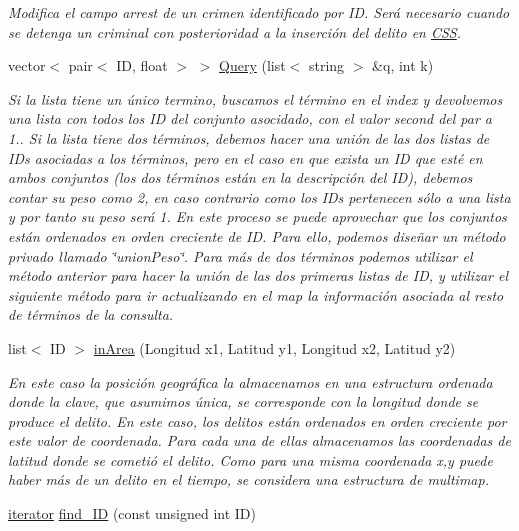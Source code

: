 \begin{DoxyCompactItemize}
\begin{DoxyCompactList}\small\item\em Modifica el campo arrest de un crimen identificado por I\+D. Será necesario cuando se detenga un criminal con posterioridad a la inserción del delito en \hyperlink{classCSS}{C\+S\+S}. \end{DoxyCompactList}\item 
\hypertarget{classCSS_a000e80598d854ef16f4c49365b707b2c}{}vector$<$ pair$<$ I\+D, float $>$ $>$ \hyperlink{classCSS_a000e80598d854ef16f4c49365b707b2c}{Query} (list$<$ string $>$ \&q, int k)\label{classCSS_a000e80598d854ef16f4c49365b707b2c}

\begin{DoxyCompactList}\small\item\em Si la lista tiene un único termino, buscamos el término en el index y devolvemos una lista con todos los I\+D del conjunto asocidado, con el valor second del par a 1.. Si la lista tiene dos términos, debemos hacer una unión de las dos listas de I\+Ds asociadas a los términos, pero en el caso en que exista un I\+D que esté en ambos conjuntos (los dos términos están en la descripción del I\+D), debemos contar su peso como 2, en caso contrario como los I\+Ds pertenecen sólo a una lista y por tanto su peso será 1. En este proceso se puede aprovechar que los conjuntos están ordenados en orden creciente de I\+D. Para ello, podemos diseñar un método privado llamado \char`\"{}union\+Peso\char`\"{}. Para más de dos términos podemos utilizar el método anterior para hacer la unión de las dos primeras listas de I\+D, y utilizar el siguiente método para ir actualizando en el map la información asociada al resto de términos de la consulta. \end{DoxyCompactList}\item 
\hypertarget{classCSS_ab4cda3a2b096b51e39a96a380eec92a7}{}list$<$ I\+D $>$ \hyperlink{classCSS_ab4cda3a2b096b51e39a96a380eec92a7}{in\+Area} (Longitud x1, Latitud y1, Longitud x2, Latitud y2)\label{classCSS_ab4cda3a2b096b51e39a96a380eec92a7}

\begin{DoxyCompactList}\small\item\em En este caso la posición geográfica la almacenamos en una estructura ordenada donde la clave, que asumimos única, se corresponde con la longitud donde se produce el delito. En este caso, los delitos están ordenados en orden creciente por este valor de coordenada. Para cada una de ellas almacenamos las coordenadas de latitud donde se cometió el delito. Como para una misma coordenada x,y puede haber más de un delito en el tiempo, se considera una estructura de multimap. \end{DoxyCompactList}\item 
\hypertarget{classCSS_a9ef91ca38be52afee9474206d63ce35b}{}\hyperlink{classCSS_1_1iterator}{iterator} \hyperlink{classCSS_a9ef91ca38be52afee9474206d63ce35b}{find\+\_\+\+I\+D} (const unsigned int I\+D)\label{classCSS_a9ef91ca38be52afee9474206d63ce35b}


\end{DoxyCompactItemize}
